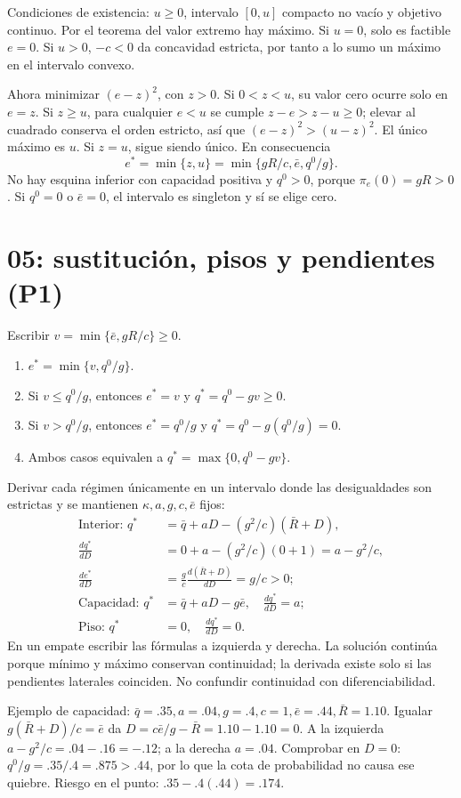 \documentclass[11pt]{article}
\begin{document}
Condiciones de existencia: $u\ge0$, intervalo $[0,u]$ compacto no vacío y
objetivo continuo. Por el teorema del valor extremo hay máximo. Si $u=0$,
solo es factible $e=0$. Si $u>0$, $-c<0$ da concavidad estricta, por tanto
a lo sumo un máximo en el intervalo convexo.

Ahora minimizar $(e-z)^2$, con $z>0$. Si $0<z<u$, su valor cero ocurre solo
en $e=z$. Si $z\ge u$, para cualquier $e<u$ se cumple
$z-e>z-u\ge0$; elevar al cuadrado conserva el orden estricto, así que
$(e-z)^2>(u-z)^2$. El único máximo es $u$. Si $z=u$, sigue siendo único.
En consecuencia
\[
e^*=\min\{z,u\}=\min\{gR/c,\bar e,q^0/g\}.
\]
No hay esquina inferior con capacidad positiva y $q^0>0$, porque $\pi_e(0)=gR>0$.
Si $q^0=0$ o $\bar e=0$, el intervalo es singleton y sí se elige cero.

\section{05: sustitución, pisos y pendientes (P1)}
Escribir $v=\min\{\bar e,gR/c\}\ge0$.
\begin{enumerate}
\item $e^*=\min\{v,q^0/g\}$.
\item Si $v\le q^0/g$, entonces $e^*=v$ y $q^*=q^0-gv\ge0$.
\item Si $v>q^0/g$, entonces $e^*=q^0/g$ y $q^*=q^0-g(q^0/g)=0$.
\item Ambos casos equivalen a $q^*=\max\{0,q^0-gv\}$.
\end{enumerate}
Derivar cada régimen únicamente en un intervalo donde las desigualdades son
estrictas y se mantienen $\kappa,a,g,c,\bar e$ fijos:
\begin{align*}
\text{Interior: }q^*&=\bar q+aD-(g^2/c)(\bar R+D),\\
\frac{dq^*}{dD}&=0+a-(g^2/c)(0+1)=a-g^2/c,\\
\frac{de^*}{dD}&=\frac{g}{c}\frac{d(\bar R+D)}{dD}=g/c>0;\\
\text{Capacidad: }q^*&=\bar q+aD-g\bar e,\quad \frac{dq^*}{dD}=a;\\
\text{Piso: }q^*&=0,\quad \frac{dq^*}{dD}=0.
\end{align*}
En un empate escribir las fórmulas a izquierda y derecha. La solución
continúa porque mínimo y máximo conservan continuidad; la derivada existe
solo si las pendientes laterales coinciden. No confundir continuidad con
diferenciabilidad.

Ejemplo de capacidad: $\bar q=.35,a=.04,g=.4,c=1,\bar e=.44,\bar R=1.10$.
Igualar $g(\bar R+D)/c=\bar e$ da $D=c\bar e/g-\bar R=1.10-1.10=0$.
A la izquierda $a-g^2/c=.04-.16=-.12$; a la derecha $a=.04$.
Comprobar en $D=0$: $q^0/g=.35/.4=.875>.44$, por lo que la cota de
probabilidad no causa ese quiebre. Riesgo en el punto: $.35-.4(.44)=.174$.
\end{document}
